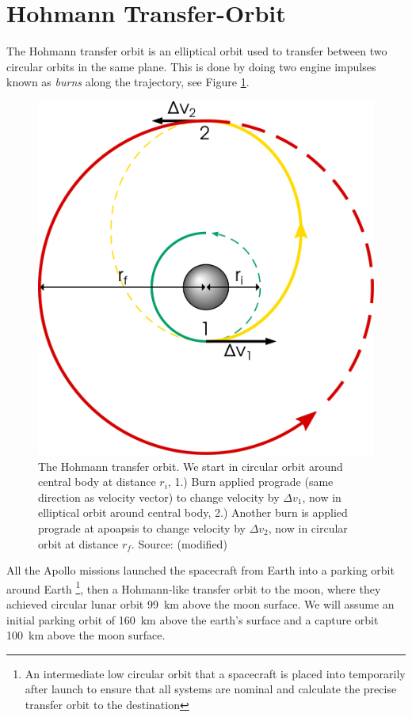 \section{Hohmann Transfer-Orbit} \label{ch:hohmann}
The Hohmann transfer orbit is an elliptical orbit used to transfer between two circular orbits in the same plane. This is done by doing two engine impulses known as \emph{burns} along the trajectory, see Figure \ref{fig:hohmann}.

\begin{figure}[ht!]
\centering
\includegraphics[scale=0.3]{fig/hohmann.pdf}
\caption{The Hohmann transfer orbit. We start in circular orbit around central body at distance $r_i$, 1.) Burn applied prograde (same direction as velocity vector) to change velocity by $\Delta v_1$, now in elliptical orbit around central body, 2.) Another burn is applied prograde at apoapsis to change velocity by $\Delta v_2$, now in circular orbit at distance $r_f$. Source: \cite{fig-hohmann} (modified)}
\label{fig:hohmann}
\end{figure}

All the Apollo missions launched the spacecraft from Earth into a parking orbit around Earth \cite{apollo-parking}\footnote{An intermediate low circular orbit that a spacecraft is placed into temporarily after launch to ensure that all systems are nominal and calculate the precise transfer orbit to the destination}, then a Hohmann-like transfer orbit to the moon, where they achieved circular lunar orbit \SI{99}{\km} above the moon surface. We will assume an initial parking orbit of \SI{160}{\km} above the earth's surface and a capture orbit \SI{100}{\km} above the moon surface.

